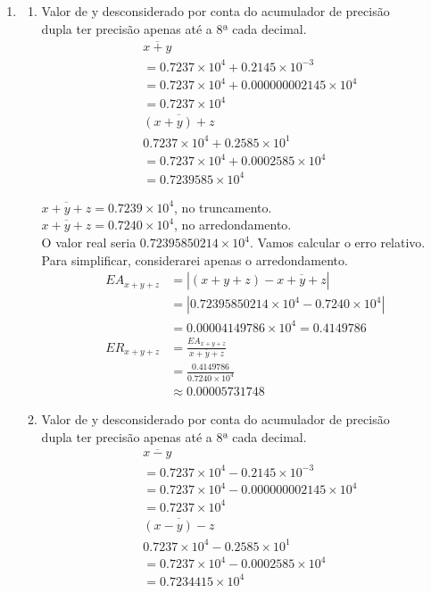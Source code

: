 \documentclass{article}
\begin{document}
\begin{enumerate}
\item
\begin{enumerate}
    \item 
    Valor de y desconsiderado por conta do acumulador de precisão \\dupla ter precisão apenas até a 8ª cada decimal.
    \begin{align*}
        &\overline{x + y} \\
        &=0.7237 \times 10^{4} + 0.2145 \times 10^{-3}\\
        &=0.7237 \times 10^{4} + 0.000000002145 \times 10^{4}\\
        &=0.7237 \times 10^{4} \\
        &\overline{(x+y)+z} \\
        &0.7237 \times 10^{4} + 0.2585 \times 10^{1}\\
        &=0.7237 \times 10^{4} + 0.0002585 \times 10^{4}\\
        &=0.7239585 \times 10^{4}
    \end{align*}
    
    $\overline{x+y+z} = 0.7239 \times 10^{4}$, no truncamento. \\
    $\overline{x+y+z} = 0.7240 \times 10^{4}$, no arredondamento. \\

    O valor real seria $0.72395850214\times 10^{4}$. Vamos calcular o erro relativo.\\Para simplificar, considerarei apenas o arredondamento.
    \begin{align*}
        EA_{x+y+z} &= |(x+y+z) - \overline{x+y+z}|\\
        &=|0.72395850214\times 10^{4} - 0.7240 \times 10^{4}|\\
        &=0.00004149786 \times10^{4} = 0.4149786\\
        ER_{x+y+z} &= \frac{EA_{x+y+z}}{\overline{x+y+z}}\\
        &=\frac{0.4149786}{0.7240 \times 10^{4}}\\
        &\approx 0.00005731748
    \end{align*}
    \item 
    Valor de y desconsiderado por conta do acumulador de precisão \\dupla ter precisão apenas até a 8ª cada decimal.
    \begin{align*}
        &\overline{x - y} \\
        &=0.7237 \times 10^{4} - 0.2145 \times 10^{-3}\\
        &=0.7237 \times 10^{4} - 0.000000002145 \times 10^{4}\\
        &=0.7237 \times 10^{4} \\
        &\overline{(x-y)-z} \\
        &0.7237 \times 10^{4} - 0.2585 \times 10^{1}\\
        &=0.7237 \times 10^{4} - 0.0002585 \times 10^{4}\\
        &=0.7234415 \times 10^{4}
    \end{align*}


\end{enumerate}
\end{enumerate}
\end{document}
